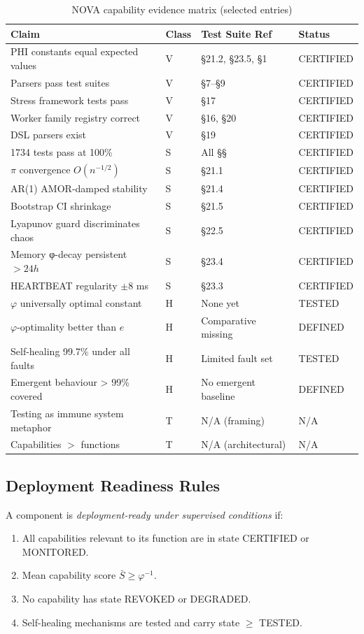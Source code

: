 \documentclass[11pt,a4paper]{article}
\begin{document}
\begin{table}[h]
\centering
\caption{NOVA capability evidence matrix (selected entries)}
\label{tab:evidence}
\begin{tabular}{p{5.5cm}lll}
\toprule
Claim & Class & Test Suite Ref & Status \\
\midrule
PHI constants equal expected values & V & §21.2, §23.5, §1 & CERTIFIED \\
Parsers pass test suites & V & §7--§9 & CERTIFIED \\
Stress framework tests pass & V & §17 & CERTIFIED \\
Worker family registry correct & V & §16, §20 & CERTIFIED \\
DSL parsers exist & V & §19 & CERTIFIED \\
1734 tests pass at 100\% & S & All §§ & CERTIFIED \\
$\pi$ convergence $O(n^{-1/2})$ & S & §21.1 & CERTIFIED \\
AR(1) AMOR-damped stability & S & §21.4 & CERTIFIED \\
Bootstrap CI shrinkage & S & §21.5 & CERTIFIED \\
Lyapunov guard discriminates chaos & S & §22.5 & CERTIFIED \\
Memory φ-decay persistent $>24h$ & S & §23.4 & CERTIFIED \\
HEARTBEAT regularity $\pm 8$ ms & S & §23.3 & CERTIFIED \\
$\varphi$ universally optimal constant & H & None yet & TESTED \\
$\varphi$-optimality better than $e$ & H & Comparative missing & DEFINED \\
Self-healing 99.7\% under all faults & H & Limited fault set & TESTED \\
Emergent behaviour > 99\% covered & H & No emergent baseline & DEFINED \\
Testing as immune system metaphor & T & N/A (framing) & N/A \\
Capabilities $>$ functions & T & N/A (architectural) & N/A \\
\bottomrule
\end{tabular}
\end{table}

\subsection{Deployment Readiness Rules}

A component is \emph{deployment-ready under supervised conditions} if:
\begin{enumerate}[noitemsep]
  \item All capabilities relevant to its function are in state CERTIFIED or MONITORED.
  \item Mean capability score $\bar{S} \ge \varphi^{-1}$.
  \item No capability has state REVOKED or DEGRADED.
  \item Self-healing mechanisms are tested and carry state $\ge$ TESTED.
\end{enumerate}
\end{document}
